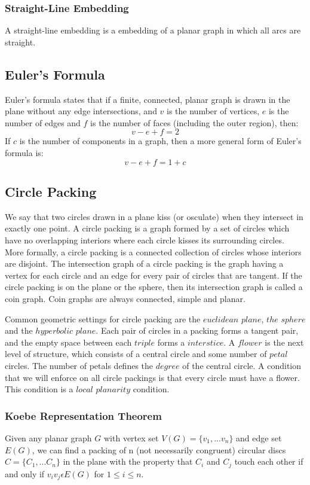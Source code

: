 \documentclass{article}
\begin{document}
\subsubsection{Straight-Line Embedding}
A straight-line embedding is a embedding of a planar graph in which all arcs are straight.
\subsection{Euler's Formula}
Euler's formula states that if a finite, connected, planar graph is drawn in the plane without any edge intersections, and $v$ is the number of vertices, $e$ is the number of edges and $f$ is the number of faces (including the outer region), then: 
\begin{equation} 
v-e+f=2
\end{equation}
If $c$ is the number of components in a graph, then a more general form of Euler's formula is:
\begin{equation} 
v-e+f= 1 + c
\end{equation}
\subsection{Circle Packing}
We say that two circles drawn in a plane kiss (or osculate) when they intersect in exactly one point. A circle packing is a graph formed by a set of circles which have no overlapping interiors where each circle kisses its surrounding circles. More formally, a circle packing is a connected collection of circles whose interiors are disjoint. The intersection graph of a circle packing is the graph having a vertex for each circle and an edge for every pair of circles that are tangent. If the circle packing is on the plane or the sphere, then its intersection graph is called a coin graph. Coin graphs are always connected, simple and planar. 

Common geometric settings for circle packing are the $euclidean$ $plane$, $the$ $sphere$ and the $hyperbolic$ $plane$. Each pair of circles in a packing forms a tangent pair, and the empty space between each $triple$ forms a $interstice$. A $flower$ is the next level of structure, which consists of a central circle and some number of $petal$ circles. The number of petals defines the $degree$ of the central circle. A condition that we will enforce on all circle packings is that every circle must have a flower. This condition is a $local$ $planarity$ condition. \citep{introCirlceacking}

\subsubsection{Koebe Representation Theorem}
Given any planar graph $G$ with vertex set $V(G) = \{v_1, ... v_n \}$ and edge set $E(G)$, we can find a packing of n (not necessarily congruent) circular discs $C= \{C_1,... C_n\}$ in the plane with the property that $C_i$ and $C_j$ touch each other if and only if $v_i v_j \epsilon E(G)$ for $1 \le i \le n$. \citep{combinatorialGeometry}
\end{document}
